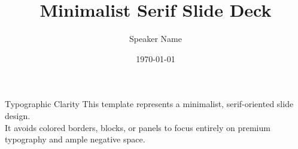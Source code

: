 \documentclass{beamer}
\title{\LARGE Minimalist Serif Slide Deck}
\author{Speaker Name}
\date{\today}
\begin{document}
\maketitle

\begin{frame}{Typographic Clarity}
  This template represents a minimalist, serif-oriented slide design.
  \vspace{1cm}\\
  It avoids colored borders, blocks, or panels to focus entirely on premium typography and ample negative space.
\end{frame}
\end{document}
